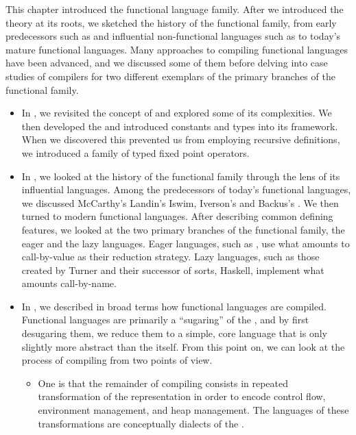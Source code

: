 \label{functional:conclusion}
This chapter introduced the functional language family. After we introduced the theory at its roots, we sketched the history of the functional family, from early predecessors such as  and influential non-functional languages such as  to today's mature functional languages. Many approaches to compiling functional languages have been advanced, and we discussed some of them before delving into case studies of compilers for two different exemplars of the primary branches of the functional family.

\begin{itemize}
\item In , we revisited the concept of  and explored some of its complexities. We then developed the \lambdacalc and introduced constants and types into its framework. When we discovered this prevented us from employing recursive definitions, we introduced a family of typed fixed point operators.

\item In , we looked at the history of the functional family through the lens of its influential languages. Among the predecessors of today's functional languages, we discussed McCarthy's  Landin's Iswim, Iverson's  and Backus's . We then turned to modern functional languages. After describing common defining features, we looked at the two primary branches of the functional family, the eager and the lazy languages. Eager languages, such as , use what amounts to call-by-value as their reduction strategy. Lazy languages, such as those created by Turner and their successor of sorts, Haskell, implement what amounts call-by-name.

\item In , we described in broad terms how functional languages are compiled. Functional languages are primarily a ``sugaring'' of the \lambdacalc{}, and by first desugaring them, we reduce them to a simple, core language that is only slightly more abstract than the \lambdacalc itself. From this point on, we can look at the process of compiling from two points of view.
\begin{itemize}
\item
One is that the remainder of compiling consists in repeated transformation of the representation in order to encode control flow, environment management, and heap management. The languages of these transformations are conceptually dialects of the \lambdacalc{}.


\end{itemize}
\end{itemize}
